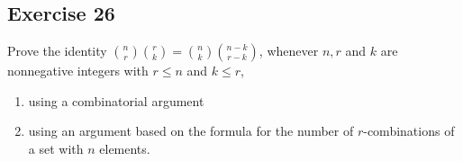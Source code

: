 \documentclass{article}
\theoremstyle{mytheoremstyle}
\theoremstyle{mytheoremstyle}
\theoremstyle{myproblemstyle}
\begin{document}
    \subsection*{Exercise 26}
    Prove the identity \(\binom{n}{r}\binom{r}{k} = \binom{n}{k}\binom{n - k}{r - k}\), whenever \(n, r\) and
    \(k\) are nonnegative integers with \(r \leq n\) and \(k \leq r\),
    \begin{enumerate} [label = (\alph*)]
        \item using a combinatorial argument
        \item using an argument based on the formula for the number of \(r\)-combinations of a set with \(n\) elements.
    \end{enumerate}
\end{document}

